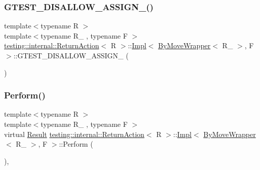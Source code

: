 \subsubsection{\texorpdfstring{G\+T\+E\+S\+T\+\_\+\+D\+I\+S\+A\+L\+L\+O\+W\+\_\+\+A\+S\+S\+I\+G\+N\+\_\+()}{GTEST\_DISALLOW\_ASSIGN\_()}}
{\footnotesize\ttfamily template$<$typename R $>$ \\
template$<$typename R\+\_\+ , typename F $>$ \\
\hyperlink{classtesting_1_1internal_1_1ReturnAction}{testing\+::internal\+::\+Return\+Action}$<$ R $>$\+::\hyperlink{classtesting_1_1internal_1_1ReturnAction_1_1Impl}{Impl}$<$ \hyperlink{structtesting_1_1internal_1_1ByMoveWrapper}{By\+Move\+Wrapper}$<$ R\+\_\+ $>$, F $>$\+::G\+T\+E\+S\+T\+\_\+\+D\+I\+S\+A\+L\+L\+O\+W\+\_\+\+A\+S\+S\+I\+G\+N\+\_\+ (\begin{DoxyParamCaption}\item[{\hyperlink{classtesting_1_1internal_1_1ReturnAction_1_1Impl}{Impl}$<$ \hyperlink{structtesting_1_1internal_1_1ByMoveWrapper}{By\+Move\+Wrapper}$<$ R\+\_\+ $>$, F $>$}]{ }\end{DoxyParamCaption})\hspace{0.3cm}{\ttfamily [private]}}

\mbox{\label{classtesting_1_1internal_1_1ReturnAction_1_1Impl_3_01ByMoveWrapper_3_01R___01_4_00_01F_01_4_a4f6e45f593abffb7a8b26cebfc4a0262}} 
\subsubsection{\texorpdfstring{Perform()}{Perform()}}
{\footnotesize\ttfamily template$<$typename R $>$ \\
template$<$typename R\+\_\+ , typename F $>$ \\
virtual \hyperlink{classtesting_1_1ActionInterface_a7477de2fe3e4e01c59db698203acaee7}{Result} \hyperlink{classtesting_1_1internal_1_1ReturnAction}{testing\+::internal\+::\+Return\+Action}$<$ R $>$\+::\hyperlink{classtesting_1_1internal_1_1ReturnAction_1_1Impl}{Impl}$<$ \hyperlink{structtesting_1_1internal_1_1ByMoveWrapper}{By\+Move\+Wrapper}$<$ R\+\_\+ $>$, F $>$\+::Perform (\begin{DoxyParamCaption}\item[{const \hyperlink{classtesting_1_1ActionInterface_af72720d864da4d606629e83edc003511}{Argument\+Tuple} \&}]{ }\end{DoxyParamCaption})\hspace{0.3cm}{\ttfamily [inline]}, {\ttfamily [virtual]}}



